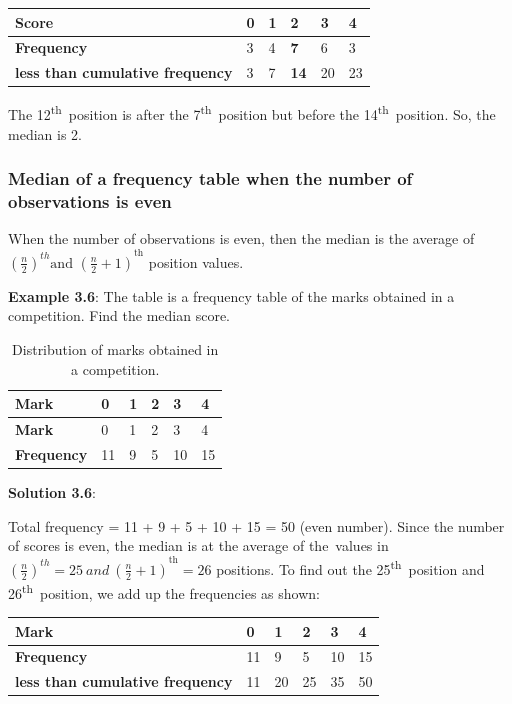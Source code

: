 \documentclass[
]{book}
\begin{document}
\begin{longtable}[]{@{}llllll@{}}
\toprule
\textbf{Score} & 0 & 1 & \textbf{2} & 3 & 4 \\
\midrule
\endhead
\textbf{Frequency} & 3 & 4 & \textbf{7} & 6 & 3 \\
\textbf{less than cumulative frequency} & 3 & 7 & \textbf{14} & 20 & 23 \\
\bottomrule
\end{longtable}

The 12\textsuperscript{th}~position is after the 7\textsuperscript{th}~position but before the
14\textsuperscript{th}~position. So, the median is 2.

\hypertarget{median-of-a-frequency-table-when-the-number-of-observations-is-even}{%
\subsubsection{Median of a frequency table when the number of observations is even}\label{median-of-a-frequency-table-when-the-number-of-observations-is-even}}

When the number of observations is even, then the median is the average
of
\({\left( \frac{n}{2} \right)^{th}\text{and\ }\left( \frac{n}{2} + 1 \right)}^{\text{th}}\)
position values.

\textbf{Example 3.6}: The table is a frequency table of the marks obtained in a competition. Find the median score.

\begin{longtable}[]{@{}llllll@{}}
\caption{\label{tab:median} Distribution of marks obtained in a competition.}\tabularnewline
\toprule
\textbf{Mark} & 0 & 1 & 2 & 3 & 4 \\
\midrule
\endfirsthead
\toprule
\textbf{Mark} & 0 & 1 & 2 & 3 & 4 \\
\midrule
\endhead
\textbf{Frequency} & 11 & 9 & 5 & 10 & 15 \\
\bottomrule
\end{longtable}

\textbf{Solution 3.6}:

Total frequency = 11 + 9 + 5 + 10 + 15 = 50 (even number). Since the
number of scores is even, the median is at the average of the~values in
\({\left( \frac{n}{2} \right)^{th} = 25\ and\ \left( \frac{n}{2} + 1 \right)}^{\text{th}} = 26\)
positions. To find out the 25\textsuperscript{th}~position and 26\textsuperscript{th}~position, we add up the frequencies as shown:

\begin{longtable}[]{@{}llllll@{}}
\toprule
\textbf{Mark} & 0 & 1 & 2 & 3 & 4 \\
\midrule
\endhead
\textbf{Frequency} & 11 & 9 & 5 & 10 & 15 \\
\textbf{less than cumulative frequency} & 11 & 20 & 25 & 35 & 50 \\
\bottomrule
\end{longtable}
\end{document}
